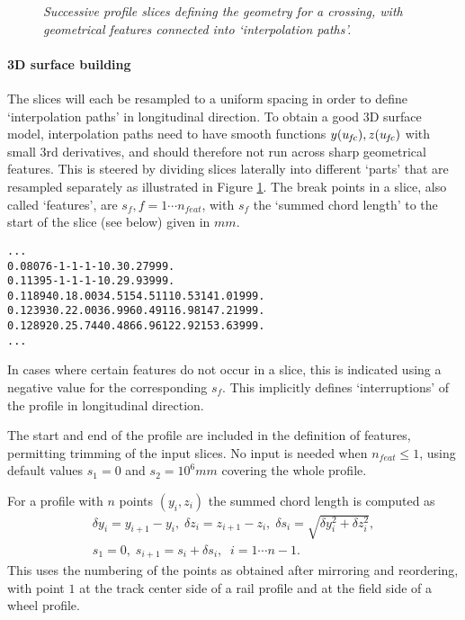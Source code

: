 \documentclass[12pt]{report}
\begin{document}
\begin{figure}[bt]
\centering
{}
\caption{\em Successive profile slices defining the geometry for a crossing,
        with geometrical features connected into `interpolation paths'.}
\label{fig:slcs_features}
\end{figure}

\paragraph{3D surface building}

The slices will each be resampled to a uniform spacing in order to define
`interpolation paths' in longitudinal direction. To obtain a good 3D
surface model, interpolation paths need to have smooth functions $y(u_{\mkern-2muf\mkern-2muc}),
z(u_{\mkern-2muf\mkern-2muc})$ with small 3rd derivatives, and should therefore not run across
sharp geometrical features. This is steered by dividing slices laterally
into different `parts' that are resampled separately as illustrated in
Figure \ref{fig:slcs_features}. The break points in a slice, also called
`features', are $s_f, f=1\cdots n_{feat}$, with $s_f$ the `summed chord
length' to the start of the slice (see below) given in $\unit{mm}$.

\begin{alltt}\small
%  - S_F positions at geometrical features at start/end of each part per slice
% U_SLC [usr]   S_F [mm],  F = 1 .. NFEAT
          ...
 0.08076     -1      -1       -1       -1       0.      30.27   999.
 0.11395     -1      -1       -1       -1       0.      29.93   999.
 0.11894      0.    18.00    34.51    54.51   110.53   141.01   999.
 0.12393      0.    22.00    36.99    60.49   116.98   147.21   999.
 0.12892      0.    25.74    40.48    66.96   122.92   153.63   999.
          ...
\end{alltt}
In cases where certain features do not occur in a slice, this is indicated
using a negative value for the corresponding $s_f$. This implicitly defines
`interruptions' of the profile in longitudinal direction.

The start and end of the profile are included in the definition of features,
permitting trimming of the input slices. No input is needed when
$n_{feat}\le 1$, using default values $s_1=0$ and $s_2=10^6\unit{mm}$
covering the whole profile. 

For a profile with $n$ points $(y_i,z_i)$ the summed chord length is computed
as
\begin{eqnarray}
    \delta y_i = y_{i+1}-y_i, \;
    \delta z_i = z_{i+1}-z_i, \;
    \delta s_i = \sqrt{ \delta y_i^2 + \delta z_i^2 }, \nonumber \\
    s_1 = 0, \; s_{i+1} = s_i + \delta s_i , \;\;
                i = 1 \cdots n-1. \label{eq:summed_chord}
\end{eqnarray}
This uses the numbering of the points as obtained after mirroring and
reordering, with point $1$ at the track center side of a rail profile
and at the field side of a wheel profile.
\end{document}
